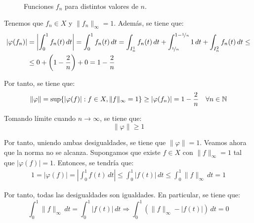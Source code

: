 \documentclass[12pt]{article}
\begin{document}
\begin{ejercicio}[2.5 puntos]
\begin{figure}[h]
        \caption{Funciones $f_n$ para distintos valores de $n$.}
        \label{fig:funciones_fn}
    \end{figure}

    Tenemos que $f_n \in X$ y $\|f_n\|_\infty = 1$. Además, se tiene que:
    \begin{align*}
        |\varphi(f_n)| &= \left|\int_{0}^{1} f_n(t)\,dt\right| = \int_{0}^{1} f_n(t)\,dt = \int_{I_n^1} f_n(t)\,dt + \int_{\nicefrac{1}{n}}^{1 - \nicefrac{1}{n}} 1\,dt + \int_{I_n^2} f_n(t)\,dt
        \leq \\ &\leq 0+ \left(1 - \frac{2}{n}\right) + 0 = 1 - \frac{2}{n}
    \end{align*}

    Por tanto, se tiene que:
    \begin{equation*}
        \|\varphi\| = \sup\{|\varphi(f)| : f \in X, \|f\|_\infty = 1\} \geq |\varphi(f_n)| = 1 - \frac{2}{n} \quad \forall n \in \mathbb{N}
    \end{equation*}

    Tomando límite cuando $n \to \infty$, se tiene que:
    \begin{equation*}
        \|\varphi\| \geq 1
    \end{equation*}

    Por tanto, uniendo ambas desigualdades, se tiene que $\|\varphi\| = 1$. Veamos ahora que la norma no se alcanza. Supongamos que existe $f \in X$ con $\|f\|_\infty = 1$ tal que $|\varphi(f)| = 1$. Entonces, se tendría que:
    \begin{align*}
        1 = |\varphi(f)| = \left|\int_{0}^{1} f(t)\,dt\right| \leq \int_{0}^{1} |f(t)|\,dt \leq \int_{0}^{1} \|f\|_\infty\,dt = 1
    \end{align*}

    Por tanto, todas las desigualdades son igualdades. En particular, se tiene que:
    \begin{equation*}
        \int_{0}^{1} \|f\|_\infty\, dt = \int_{0}^{1} |f(t)|\,dt \Longrightarrow \int_{0}^{1} \left(\|f\|_\infty - |f(t)|\right)\,dt = 0
    \end{equation*}


\end{ejercicio}
\end{document}
